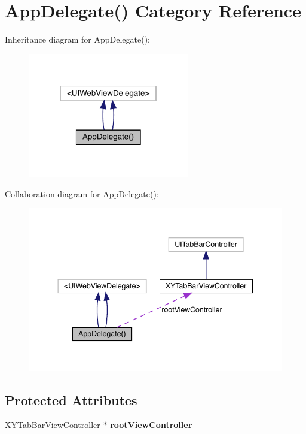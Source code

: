 \hypertarget{category_app_delegate_07_08}{}\section{App\+Delegate() Category Reference}
\label{category_app_delegate_07_08}


Inheritance diagram for App\+Delegate()\+:\nopagebreak
\begin{figure}[H]
\begin{center}
\leavevmode
\includegraphics[width=200pt]{category_app_delegate_07_08__inherit__graph}
\end{center}
\end{figure}


Collaboration diagram for App\+Delegate()\+:\nopagebreak
\begin{figure}[H]
\begin{center}
\leavevmode
\includegraphics[width=344pt]{category_app_delegate_07_08__coll__graph}
\end{center}
\end{figure}
\subsection*{Protected Attributes}
\begin{DoxyCompactItemize}
\item 
\mbox{\label{category_app_delegate_07_08_a8594aaf2e9c71e2ee650fed2172670e5}} 
\mbox{\hyperlink{interface_x_y_tab_bar_view_controller}{X\+Y\+Tab\+Bar\+View\+Controller}} $\ast$ {\bfseries root\+View\+Controller}
\end{DoxyCompactItemize}
